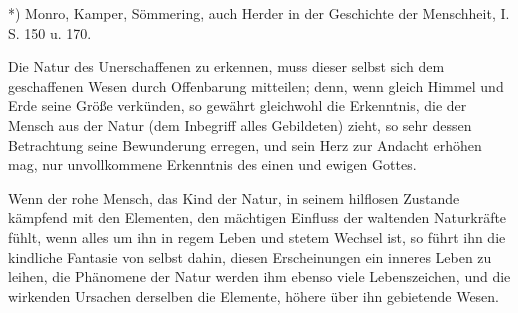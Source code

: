 \documentclass[a4paper, 11pt, oneside, polutonikogreek, german]{article}
\begin{document}
*) Monro, Kamper, Sömmering, auch Herder in der Geschichte der Menschheit, I. S. 150 u. 170.

Die Natur des Unerschaffenen zu erkennen, muss dieser selbst sich dem geschaffenen Wesen durch Offenbarung mitteilen; denn, wenn gleich Himmel und Erde seine Größe verkünden, so gewährt gleichwohl die Erkenntnis, die der Mensch aus der Natur (dem Inbegriff alles Gebildeten) zieht, so sehr dessen Betrachtung seine Bewunderung erregen, und sein Herz zur Andacht erhöhen mag, nur unvollkommene Erkenntnis des einen und ewigen Gottes.

Wenn der rohe Mensch, das Kind der Natur, in seinem hilflosen Zustande kämpfend mit den Elementen, den mächtigen Einfluss der waltenden Naturkräfte fühlt, wenn alles um ihn in regem Leben und stetem Wechsel ist, so führt ihn die kindliche Fantasie von selbst dahin, diesen Erscheinungen ein inneres Leben zu leihen, die Phänomene der Natur werden ihm ebenso viele Lebenszeichen, und die wirkenden Ursachen derselben die Elemente, höhere über ihn gebietende Wesen.
\end{document}

